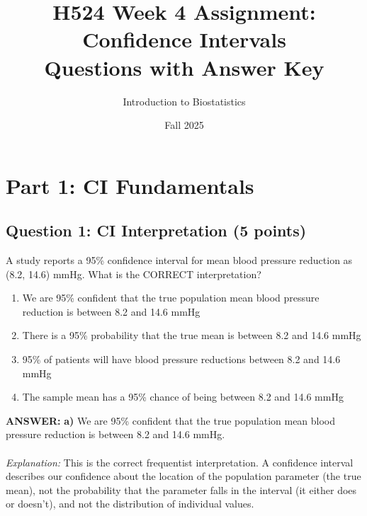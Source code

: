 \documentclass[11pt]{article}
\title{\textbf{\Large H524 Week 4 Assignment: Confidence Intervals}\\
\large Questions with Answer Key}
\author{Introduction to Biostatistics}
\date{Fall 2025}
\newcommand{\answer}[1]{\par\vspace{0.3em}\colorbox{green!10}{\parbox{\dimexpr\textwidth-2\fboxsep}{\textbf{ANSWER:} #1}}\vspace{0.3em}\par}
\begin{document}
\maketitle

\begin{center}
\end{center}

\vspace{1em}

\section*{Part 1: CI Fundamentals}

\subsection*{Question 1: CI Interpretation (5 points)}

A study reports a 95\% confidence interval for mean blood pressure reduction as (8.2, 14.6) mmHg. What is the CORRECT interpretation?

\begin{enumerate}[label=\alph*)]
\item We are 95\% confident that the true population mean blood pressure reduction is between 8.2 and 14.6 mmHg
\item There is a 95\% probability that the true mean is between 8.2 and 14.6 mmHg
\item 95\% of patients will have blood pressure reductions between 8.2 and 14.6 mmHg
\item The sample mean has a 95\% chance of being between 8.2 and 14.6 mmHg
\end{enumerate}

\answer{\textbf{a)} We are 95\% confident that the true population mean blood pressure reduction is between 8.2 and 14.6 mmHg. \\ \\
\textit{Explanation:} This is the correct frequentist interpretation. A confidence interval describes our confidence about the location of the population parameter (the true mean), not the probability that the parameter falls in the interval (it either does or doesn't), and not the distribution of individual values.}
\end{document}

